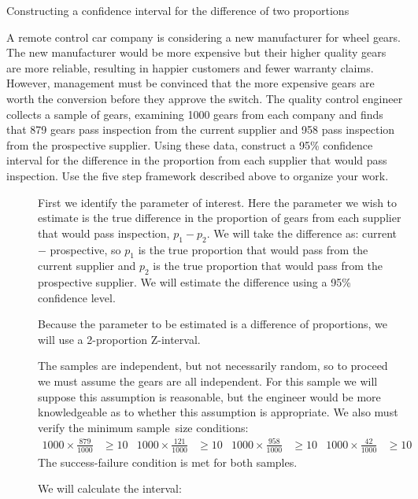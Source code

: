 \begin{onebox}{Constructing a confidence interval for the difference of two proportions}
\begin{itemize}
\end{itemize}\end{onebox}

\begin{examplewrap}
\begin{nexample}{A remote control car company is considering a new manufacturer for wheel gears. The new manufacturer would be more expensive but their higher quality gears are more reliable, resulting in happier customers and fewer warranty claims. However, management must be convinced that the more expensive gears are worth the conversion before they approve the switch. The quality control engineer collects a sample of gears, examining 1000 gears from each company and finds that 879 gears pass inspection from the current supplier and 958 pass inspection from the prospective supplier. Using these data, construct a 95\% confidence interval for the difference in the proportion from each supplier that would pass inspection.  Use the five step framework described above to organize your work.}
\label{RemoteControl}
\begin{description}
\item[] First we identify the parameter of interest.  Here the parameter we wish to estimate is the true difference in the proportion of gears from each supplier that would pass inspection, $p_1-p_2$.  We will take the difference as:  current $-$ prospective, so $p_1$ is the true proportion that would pass from the current supplier and $p_2$ is the true proportion that would pass from the prospective supplier.  We will estimate the difference using a 95\% confidence level.  
\item[] Because the parameter to be estimated is a difference of proportions, we will use a 2-proportion Z-interval.
\item[] The samples are independent, but not necessarily random, so to proceed we must assume the gears are all independent. For this sample we will suppose this assumption is reasonable, but the engineer would be more knowledgeable as to whether this assumption is appropriate. We also must verify the minimum sample~size conditions:
\begin{align*}
1000 \times \frac{879}{1000} &\ge 10
	&1000 \times \frac{121}{1000} &\ge 10
	&1000 \times \frac{958}{1000} &\ge 10
	&1000 \times \frac{42}{1000} &\ge 10
\end{align*}
The success-failure condition is met for both samples.
\item[]  We will calculate the interval: 

\end{description}
\end{nexample}
\end{examplewrap}

